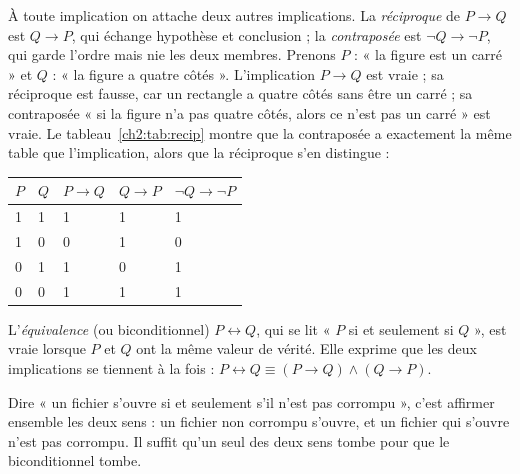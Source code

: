 À toute implication on attache deux autres implications. La \emph{réciproque} de $P \rightarrow Q$ est $Q \rightarrow P$, qui échange hypothèse et conclusion ; la \emph{contraposée} est $\lnot Q \rightarrow \lnot P$, qui garde l'ordre mais nie les deux membres. Prenons $P$ : « la figure est un carré » et $Q$ : « la figure a quatre côtés ». L'implication $P \rightarrow Q$ est vraie ; sa réciproque est fausse, car un rectangle a quatre côtés sans être un carré ; sa contraposée « si la figure n'a pas quatre côtés, alors ce n'est pas un carré » est vraie. Le tableau~\ref{ch2:tab:recip} montre que la contraposée a exactement la même table que l'implication, alors que la réciproque s'en distingue :

\begin{center}
\begin{tabular}{C{0.8cm}C{0.8cm}C{1.8cm}C{1.8cm}C{2.4cm}}
\toprule
{}$P$ & $Q$ & $P \rightarrow Q$ & $Q \rightarrow P$ & $\lnot Q \rightarrow \lnot P$\\
 & 1 & 1 & 1 & 1\\
1 & 0 & 0 & 1 & 0\\
0 & 1 & 1 & 0 & 1\\
0 & 0 & 1 & 1 & 1\\
\bottomrule
\end{tabular}
\label{ch2:tab:recip}
\end{center}

\begin{definition}[biconditionnel]
L'\emph{équivalence} (ou biconditionnel) $P \leftrightarrow Q$, qui se lit « $P$ si et seulement si $Q$ », est vraie lorsque $P$ et $Q$ ont la même valeur de vérité. Elle exprime que les deux implications se tiennent à la fois : $P \leftrightarrow Q \equiv (P \rightarrow Q) \land (Q \rightarrow P)$.
\end{definition}

Dire « un fichier s'ouvre si et seulement s'il n'est pas corrompu », c'est affirmer ensemble les deux sens : un fichier non corrompu s'ouvre, et un fichier qui s'ouvre n'est pas corrompu. Il suffit qu'un seul des deux sens tombe pour que le biconditionnel tombe.

